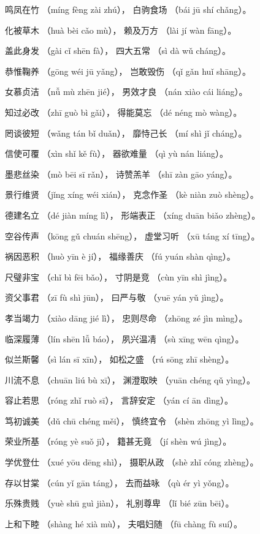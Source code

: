 \documentclass[12pt]{article}%
\begin{document}
\begin{appendices}
\begin{subappendix}
\begin{center}
鸣凤在竹 （míng fèng zài zhú）， 白驹食场 （bái jū shí chǎng）。

化被草木 （huà bèi cǎo mù）， 赖及万方 （lài jí wàn fāng）。

盖此身发 （gài cǐ shēn fà）， 四大五常 （sì dà wǔ cháng）。

恭惟鞠养 （gōng wéi jū yǎng）， 岂敢毁伤 （qǐ gǎn huǐ shāng）。

女慕贞洁 （nǚ mù zhēn jié）， 男效才良 （nán xiào cái liáng）。

知过必改 （zhī guò bì gǎi）， 得能莫忘 （dé néng mò wàng）。

罔谈彼短 （wǎng tán bǐ duǎn）， 靡恃己长 （mí shì jǐ cháng）。

信使可覆 （xìn shǐ kě fù）， 器欲难量 （qì yù nán liáng）。

墨悲丝染 （mò bēi sī rǎn）， 诗赞羔羊 （shī zàn gāo yáng）。

景行维贤 （jǐng xíng wéi xián）， 克念作圣 （kè niàn zuò shèng）。

德建名立 （dé jiàn míng lì）， 形端表正 （xíng duān biǎo zhèng）。

空谷传声 （kōng gǔ chuán shēng）， 虚堂习听 （xū táng xí tīng）。

祸因恶积 （huò yīn è jí）， 福缘善庆 （fú yuán shàn qìng）。

尺璧非宝 （chǐ bì fēi bǎo）， 寸阴是竞 （cùn yīn shì jìng）。

资父事君 （zī fù shì jūn）， 曰严与敬 （yuē yán yǔ jìng）。

孝当竭力 （xiào dāng jié lì）， 忠则尽命 （zhōng zé jìn mìng）。

临深履薄 （lín shēn lǚ báo）， 夙兴温凊 （sù xīng wēn qìng）。

似兰斯馨 （sì lán sī xīn）， 如松之盛 （rú sōng zhī shèng）。

川流不息 （chuān liú bù xī）， 渊澄取映 （yuān chéng qǔ yìng）。

容止若思 （róng zhǐ ruò sī）， 言辞安定 （yán cí ān dìng）。

笃初诚美 （dǔ chū chéng měi）， 慎终宜令 （shèn zhōng yì lìng）。

荣业所基 （róng yè suǒ jī）， 籍甚无竟 （jí shèn wú jìng）。

学优登仕 （xué yōu dēng shì）， 摄职从政 （shè zhǐ cóng zhèng）。

存以甘棠 （cún yǐ gān táng）， 去而益咏 （qù ér yì yǒng）。

乐殊贵贱 （yuè shū guì jiàn）， 礼别尊卑 （lǐ bié zūn bēi）。

上和下睦 （shàng hé xià mù）， 夫唱妇随 （fū chàng fù suí）。


\end{center}
\end{subappendix}
\end{appendices}
\end{document}
